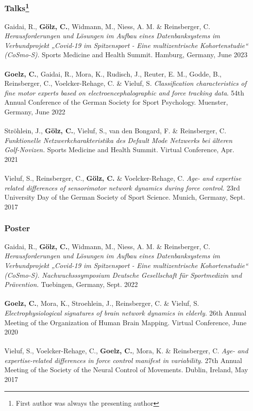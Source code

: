 \subsubsection*{Talks\footnote{First author was always the presenting author}}
Gaidai, R., \textbf{Gölz, C.}, Widmann, M., Niess, A. M. \& Reinsberger, C. \textit{Herausforderungen und Lösungen im Aufbau eines Datenbanksystems im Verbundprojekt „Covid-19 im Spitzensport - Eine multizentrische Kohortenstudie“ (CoSmo-S).} Sports Medicine and Health Summit. Hamburg, Germany, June 2023\\
\\
\textbf{Goelz, C.}, Gaidai, R., Mora, K., Rudisch, J., Reuter, E. M., Godde, B., Reinsberger, C., Voelcker-Rehage, C. \& Vieluf, S. \textit{Classification characteristics of fine motor experts based on electroencephalographic and force tracking data}. 54th Annual Conference of the German Society for Sport Psychology. Muenster, Germany, June 2022\\
\\
Ströhlein, J., \textbf{Gölz, C.}, Vieluf, S., van den Bongard, F. \& Reinsberger, C.\textit{ Funktionelle Netzwerkcharakteristika des Default Mode Netzwerks bei älteren Golf-Novizen.} Sports Medicine and Health Summit. Virtual Conference, Apr. 2021\\
\\
Vieluf, S., Reinsberger, C., \textbf{Gölz, C.} \& Voelcker-Rehage, C. \textit{Age- and expertise related differences of sensorimotor network dynamics during force control.} 23rd University Day of the German Society of Sport Science. Munich, Germany, Sept. 2017\\

\subsubsection*{Poster\footnotemark[2]}
Gaidai, R., \textbf{Gölz, C.}, Widmann, M., Niess, A. M. \& Reinsberger, C. \textit{Herausforderungen und Lösungen im Aufbau eines Datenbanksystems im Verbundprojekt „Covid-19 im Spitzensport - Eine multizentrische Kohortenstudie“ (CoSmo-S). Nachwuchsssymposium Deutsche Gesellschaft für Sportmedizin und Prävention.} Tuebingen, Germany, Sept. 2022\\
\\
\textbf{Goelz, C.}, Mora, K., Stroehlein, J., Reinsberger, C. \& Vieluf, S. \textit{Electrophysiological signatures of brain network dynamics in elderly.} 26th Annual Meeting of the Organization of Human Brain Mapping. Virtual Conference, June 2020\\
\\
Vieluf, S., Voelcker-Rehage, C., \textbf{Goelz, C.}, Mora, K. \& Reinsberger, C. \textit{Age- and expertise-related differences in force control manifest in variability.} 27th Annual Meeting of the Society of the Neural Control of Movements. Dublin, Ireland, May 2017

